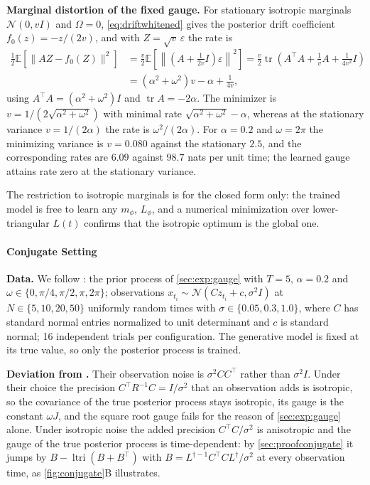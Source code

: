 \documentclass{article} %
\newcommand{\postdrift}{f}
\newcommand{\gauge}{\Omega}
\newcommand{\tr}{\operatorname{tr}}
\newcommand{\ltri}{\operatorname{ltri}}
\newcommand{\E}{\mathbb{E}}
\newcommand{\Norm}{\mathcal{N}}
\begin{document}
\textbf{Marginal distortion of the fixed gauge.} For stationary isotropic marginals $\Norm(0, v I)$ and $\gauge = 0$, \cref{eq:driftwhitened} gives the posterior drift coefficient $\postdrift_0(z) = -z / (2v)$, and with $Z = \sqrt{v} \, \varepsilon$ the rate is
\begin{align*}
    \frac{1}{2} \E \left[ \| A Z - \postdrift_0(Z) \|^2 \right] &= \frac{v}{2} \E \left[ \left\| \left( A + \tfrac{1}{2v} I \right) \varepsilon \right\|^2 \right] = \frac{v}{2} \tr \left( A^\top A + \tfrac{1}{v} A + \tfrac{1}{4v^2} I \right) \\
    &= (\alpha^2 + \omega^2) v - \alpha + \frac{1}{4v},
\end{align*}
using $A^\top A = (\alpha^2 + \omega^2) I$ and $\tr A = -2\alpha$. The minimizer is $v = 1 / (2 \sqrt{\alpha^2 + \omega^2})$ with minimal rate $\sqrt{\alpha^2 + \omega^2} - \alpha$, whereas at the stationary variance $v = 1 / (2\alpha)$ the rate is $\omega^2 / (2\alpha)$. For $\alpha = 0.2$ and $\omega = 2\pi$ the minimizing variance is $v = 0.080$ against the stationary $2.5$, and the corresponding rates are $6.09$ against $98.7$ nats per unit time; the learned gauge attains rate zero at the stationary variance.

The restriction to isotropic marginals is for the closed form only: the trained model is free to learn any $m_\phi$, $L_\phi$, and a numerical minimization over lower-triangular $L(t)$ confirms that the isotropic optimum is the global one.

\paragraph{Conjugate Setting}
\textbf{Data.} We follow \citet[Appendix C.2]{smith2026closing}: the prior process of \cref{sec:exp:gauge} with $T = 5$, $\alpha = 0.2$ and $\omega \in \{0, \pi/4, \pi/2, \pi, 2\pi\}$; observations $x_{t_i} \sim \Norm(C z_{t_i} + c, \sigma^2 I)$ at $N \in \{5, 10, 20, 50\}$ uniformly random times with $\sigma \in \{0.05, 0.3, 1.0\}$, where $C$ has standard normal entries normalized to unit determinant and $c$ is standard normal; 16 independent trials per configuration. The generative model is fixed at its true value, so only the posterior process is trained.

\textbf{Deviation from \citet{smith2026closing}.} Their observation noise is $\sigma^2 C C^\top$ rather than $\sigma^2 I$. Under their choice the precision $C^\top R^{-1} C = I / \sigma^2$ that an observation adds is isotropic, so the covariance of the true posterior process stays isotropic, its gauge is the constant $\omega J$, and the square root gauge fails for the reason of \cref{sec:exp:gauge} alone. Under isotropic noise the added precision $C^\top C / \sigma^2$ is anisotropic and the gauge of the true posterior process is time-dependent: by \cref{sec:proofconjugate} it jumps by $B - \ltri(B + B^\top)$ with $B = L^{\dagger -1} C^\top C L^\dagger / \sigma^2$ at every observation time, as \cref{fig:conjugate}B illustrates.
\end{document}
